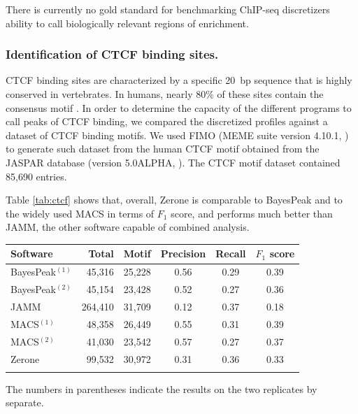 \documentclass{bioinfo}
\begin{document}
There is currently no gold standard for benchmarking ChIP-seq discretizers
ability to call biologically relevant regions of enrichment.%

\subsubsection{Identification of CTCF binding sites.}
CTCF binding sites are characterized by a specific 20~bp sequence that is
highly conserved in vertebrates. In humans, nearly 80\% of these sites contain
the consensus motif \citep{pmid17382889}.
In order to determine the capacity of the different programs to call peaks of
CTCF binding, we compared the discretized profiles against a dataset of CTCF
binding motifs. We used FIMO \citep{pmid21330290} (MEME suite version 4.10.1,
\citealp{pmid19458158}) to generate such dataset from the human CTCF motif
obtained from the JASPAR database (version 5.0{\textunderscore}ALPHA,
\citealp{pmid24194598}). The CTCF motif dataset contained 85,690 entries.

Table \ref{tab:ctcf} shows that, overall, Zerone is comparable to BayesPeak
and to the widely used MACS in terms of $F_{1}$ score, and performs much
better than JAMM, the other software capable of combined analysis.

\begin{table}[!t]
{\begin{tabular}{lrrccc}
        \toprule
        \textbf{Software} & \textbf{Total} & \textbf{Motif} &
        \textbf{Precision} & \textbf{Recall} & \textbf{$F_{1}$ score} \\
        \midrule
        BayesPeak$^{(1)}$ & 45,316 & 25,228 & 0.56 & 0.29 & 0.39 \\
        BayesPeak$^{(2)}$ & 45,154 & 23,428 & 0.52 & 0.27 & 0.36 \\
        JAMM & 264,410 & 31,709 & 0.12 & 0.37 & 0.18 \\
        MACS$^{(1)}$ & 48,358 & 26,449 & 0.55 & 0.31 & 0.39 \\
        MACS$^{(2)}$ & 41,030 & 23,542 & 0.57 & 0.27 & 0.37 \\
        Zerone & 99,532 & 30,972 & 0.31 & 0.36 & 0.33 \\
        \botrule
\end{tabular}}{
The numbers in parentheses indicate the results on the two replicates
by separate.}
\end{table}
\end{document}
